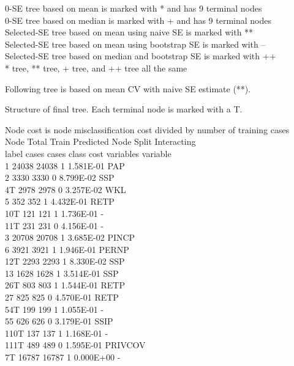 \documentclass[12pt]{article}
\begin{document}
 0-SE tree based on mean is marked with * and has 9 terminal nodes\\
 0-SE tree based on median is marked with + and has 9 terminal nodes\\
 Selected-SE tree based on mean using naive SE is marked with **\\
 Selected-SE tree based on mean using bootstrap SE is marked with --\\
 Selected-SE tree based on median and bootstrap SE is marked with ++\\
 * tree, ** tree, + tree, and ++ tree all the same
  
 Following tree is based on mean CV with naive SE estimate (**).
  
 Structure of final tree. Each terminal node is marked with a T.
  
 Node cost is node misclassification cost divided by number of training cases\\
        Node    Total    Train    Predicted        Node    Split          Interacting\\
       label    cases    cases    class            cost    variables      variable\\
           1    24038    24038    1              1.581E-01 PAP\\ 
           2     3330     3330    0              8.799E-02 SSP \\
           4T    2978     2978    0              3.257E-02 WKL\\ 
           5      352      352    1              4.432E-01 RETP \\
          10T     121      121    1              1.736E-01 - \\
          11T     231      231    0              4.156E-01 - \\
           3    20708    20708    1              3.685E-02 PINCP\\ 
           6     3921     3921    1              1.946E-01 PERNP\\ 
          12T    2293     2293    1              8.330E-02 SSP \\
          13     1628     1628    1              3.514E-01 SSP \\
          26T     803      803    1              1.544E-01 RETP \\
          27      825      825    0              4.570E-01 RETP \\
          54T     199      199    1              1.055E-01 - \\
          55      626      626    0              3.179E-01 SSIP \\
         110T     137      137    1              1.168E-01 - \\
         111T     489      489    0              1.595E-01 PRIVCOV \\
           7T   16787    16787    1              0.000E+00 - \\
  
\end{document}
